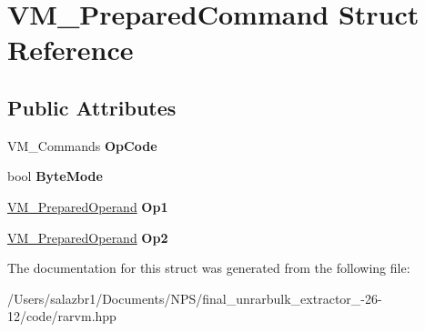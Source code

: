 \hypertarget{struct_v_m___prepared_command}{\section{V\-M\-\_\-\-Prepared\-Command Struct Reference}
\label{struct_v_m___prepared_command}
}
\subsection*{Public Attributes}
\begin{DoxyCompactItemize}
\item 
\hypertarget{struct_v_m___prepared_command_aa435fdb81435ccba7dd8dc9251a5464b}{V\-M\-\_\-\-Commands {\bfseries Op\-Code}}\label{struct_v_m___prepared_command_aa435fdb81435ccba7dd8dc9251a5464b}

\item 
\hypertarget{struct_v_m___prepared_command_a24b622f3a976111f41d471096669422c}{bool {\bfseries Byte\-Mode}}\label{struct_v_m___prepared_command_a24b622f3a976111f41d471096669422c}

\item 
\hypertarget{struct_v_m___prepared_command_a1a7c0eeee1b506f0bf6e1b21d3a7e8f9}{\hyperlink{struct_v_m___prepared_operand}{V\-M\-\_\-\-Prepared\-Operand} {\bfseries Op1}}\label{struct_v_m___prepared_command_a1a7c0eeee1b506f0bf6e1b21d3a7e8f9}

\item 
\hypertarget{struct_v_m___prepared_command_aa32d907ab68f7af12164876dc6ab628c}{\hyperlink{struct_v_m___prepared_operand}{V\-M\-\_\-\-Prepared\-Operand} {\bfseries Op2}}\label{struct_v_m___prepared_command_aa32d907ab68f7af12164876dc6ab628c}

\end{DoxyCompactItemize}


The documentation for this struct was generated from the following file\-:\begin{DoxyCompactItemize}
\item 
/\-Users/salazbr1/\-Documents/\-N\-P\-S/final\-\_\-unrarbulk\-\_\-extractor\-\_-\/26-\/12/code/rarvm.\-hpp\end{DoxyCompactItemize}

